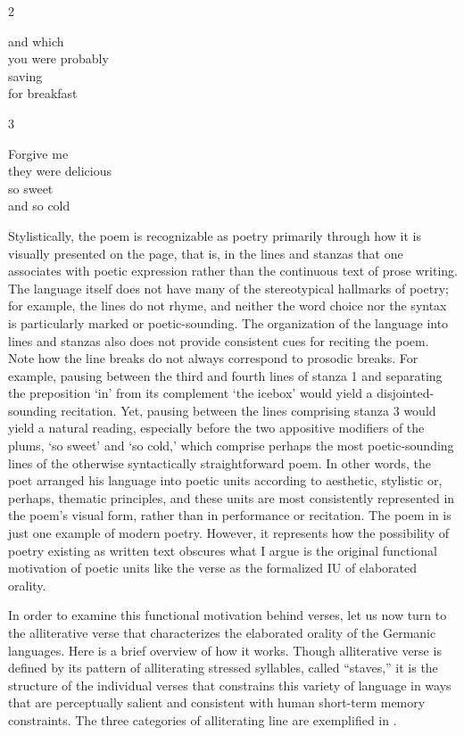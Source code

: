 2~  \parbox[t]{3cm}{and which\\
                  you were probably\\
                  saving\\
                  for breakfast
                  }\medskip

3~ \parbox[t]{3cm}{Forgive me\\
                they were delicious\\
                so sweet\\
                and so cold
                }\medskip
\z

\noindent Stylistically, the poem is recognizable as poetry primarily through how it is visually presented on the page, that is, in the lines and stanzas that one associates with poetic expression rather than the continuous text of prose writing. The language itself does not have many of the stereotypical hallmarks of poetry; for example, the lines do not rhyme, and neither the word choice nor the syntax is particularly marked or poetic-sounding. The organization of the language into lines and stanzas also does not provide consistent cues for reciting the poem. Note how the line breaks do not always correspond to prosodic breaks. For example, pausing between the third and fourth lines of stanza 1 and separating the preposition ‘in’ from its complement ‘the icebox’ would yield a disjointed-sounding recitation. Yet, pausing between the lines comprising stanza 3 would yield a natural reading, especially before the two appositive modifiers of the plums, ‘so sweet’ and ‘so cold,’ which comprise perhaps the most poetic-sounding lines of the otherwise syntactically straightforward poem. In other words, the poet arranged his language into poetic units according to aesthetic, stylistic or, perhaps, thematic principles, and these units are most consistently represented in the poem’s visual form, rather than in performance or recitation. The poem in  is just one example of modern poetry. However, it represents how the possibility of poetry existing as written text obscures what I argue is the original functional motivation of poetic units like the verse as the formalized IU of elaborated orality.

In order to examine this functional motivation behind verses, let us now turn to the alliterative verse that characterizes the elaborated orality of the Germanic languages. Here is a brief overview of how it works. Though alliterative verse is defined by its pattern of alliterating stressed syllables, called “staves,” it is the structure of the individual verses that constrains this variety of language in ways that are perceptually salient and consistent with human short-term memory constraints. The three categories of alliterating line are exemplified in .

